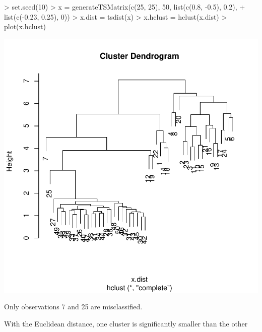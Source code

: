 \documentclass{article}
\begin{document}
\begin{Schunk}
\begin{Sinput}
> set.seed(10)
> x = generateTSMatrix(c(25, 25), 50, list(c(0.8, -0.5), 0.2), 
+     list(c(-0.23, 0.25), 0))
> x.dist = tsdist(x)
> x.hclust = hclust(x.dist)
> plot(x.hclust)
\end{Sinput}
\end{Schunk}
\includegraphics{tsclust-011}

Only observations 7 and 25 are misclassified.  

With the Euclidean distance, one cluster is significantly smaller than the other
\end{document}
